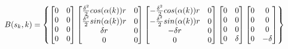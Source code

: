 \documentclass[twocolumn]{article}
\begin{document}
\begin{equation*}%
    \resizebox{.99 \columnwidth}{!}{
        $B(s_{k},k)=\begin{Bmatrix}
                \begin{bmatrix}
                    0 & 0 \\
                    0 & 0 \\
                    0 & 0 \\
                    0 & 0 \\
                \end{bmatrix}
                \begin{bmatrix}
                    \frac{\delta^{2}}{2} cos(\alpha (k))r & 0 \\
                    \frac{\delta^{2}}{2} sin(\alpha (k))r & 0 \\
                    \delta r                              & 0 \\
                    0                                     & 0 \\
                \end{bmatrix}
                \begin{bmatrix}
                    -\frac{\delta^{2}}{2} cos(\alpha (k))r & 0 \\
                    -\frac{\delta^{2}}{2} sin(\alpha (k))r & 0 \\
                    -\delta r                              & 0 \\
                    0                                      & 0 \\
                \end{bmatrix}
                \begin{bmatrix}
                    0 & 0      \\
                    0 & 0      \\
                    0 & 0      \\
                    0 & \delta \\
                \end{bmatrix}
                \begin{bmatrix}
                    0 & 0       \\
                    0 & 0       \\
                    0 & 0       \\
                    0 & -\delta \\
                \end{bmatrix}
            \end{Bmatrix} $
    }
\end{equation*}
\end{document}
